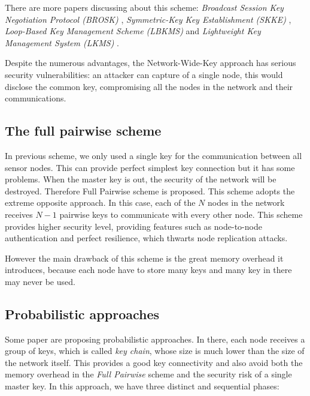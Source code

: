 There are more papers discussing about this scheme: \emph{Broadcast Session Key Negotiation Protocol (BROSK) }\cite{BROSK}, \emph{Symmetric-Key Key Establishment (SKKE)} \cite{zigbee_secure}, \emph{Loop-Based Key Management Scheme (LBKMS)} \cite{LBKMS} and \emph{Lightweight Key Management System (LKMS)} \cite{LKMS}. 

Despite the numerous advantages, the Network-Wide-Key approach has serious security vulnerabilities: an attacker can capture of a single node, this would disclose the common key, compromising all the nodes in the network and their communications.

\subsection{The full pairwise scheme}

In previous scheme, we only used a single key for the communication between all sensor nodes. This can provide perfect simplest key connection but it has some problems. When the master key is out, the security of the network will be destroyed. Therefore Full Pairwise scheme is proposed. This scheme adopts the extreme opposite approach. In this case, each of the $N$ nodes in the network receives $N - 1$ pairwise keys to communicate with every other node. This scheme provides higher security level, providing features such as node-to-node authentication and perfect resilience, which thwarts node replication attacks.

However the main drawback of this scheme is the great memory overhead it introduces, because each node have to store many keys and many key in there may never be used.

\subsection{Probabilistic approaches}

Some paper \cite{Eschenauer:2002:KSD:586110.586117} \cite{ClusterKeyGrouping} are proposing probabilistic approaches. In there, each node receives a group of keys, which is called \emph{key chain}, whose size is much lower than the size of the network itself. This provides a good key connectivity and also avoid both the memory overhead in the \emph{Full Pairwise} scheme and the security risk of a single master key. In this approach, we have three distinct and sequential phases:

